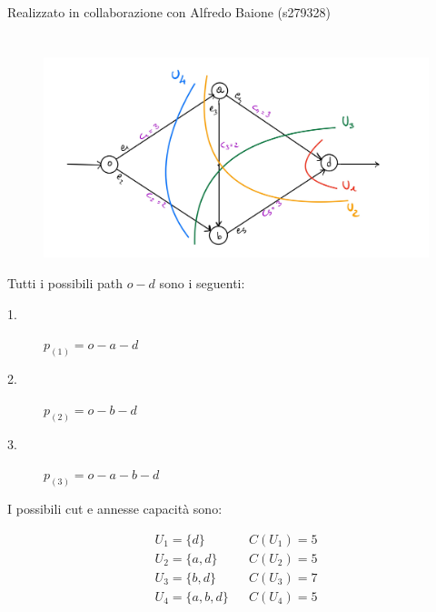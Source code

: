 \documentclass[11pt,largemargins]{homework}
\begin{document}
\maketitle

\begin{center}
  Realizzato in collaborazione con Alfredo Baione (s279328)
\end{center}


\section{}%
  
  \begin{figure}[htb]\centering
    \includegraphics[scale=0.17]{ES1_Fig1.jpg}
  \end{figure}
  Tutti i possibili path \(o-d\) sono i seguenti:

  \begin{description}
    \item[1.] \(p_{(1)}= o -a-d\)
    \item[2.] \(p_{(2)}=o-b-d\) 
    \item[3.] \(p_{(3)}= o-a-b-d\) 
  \end{description}

  I possibili cut e annesse capacità sono:

  \begin{align*}
    U_1 = \{d\}\  && C(U_1)=5 \\
    U_2 = \{a, d\} && C(U_2)=5 \\
    U_3 = \{b,d\} && C(U_3)=7 \\
    U_4 = \{a,b,d\} && C(U_4)=5
  \end{align*}
  
\end{document}
